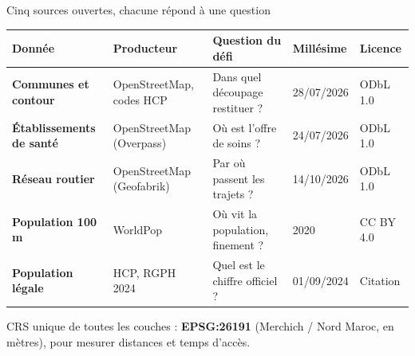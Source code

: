 \documentclass[aspectratio=169,10pt]{beamer}
\begin{document}
\begin{frame}{Cinq sources ouvertes, chacune répond à une question}
  \footnotesize
  \renewcommand{\arraystretch}{1.2}
  \begin{tabularx}{\linewidth}{@{}>{\bfseries}l>{\raggedright\arraybackslash}X>{\raggedright\arraybackslash}Xll@{}}
    \toprule
    \normalfont\textbf{Donnée} & \textbf{Producteur} & \textbf{Question du défi} & \textbf{Millésime} & \textbf{Licence} \\
    \midrule
    Communes et contour & OpenStreetMap, codes HCP & Dans quel découpage restituer ? & 28/07/2026 & ODbL 1.0 \\
    Établissements de santé & OpenStreetMap (Overpass) & Où est l'offre de soins ? & 24/07/2026 & ODbL 1.0 \\
    Réseau routier & OpenStreetMap (Geofabrik) & Par où passent les trajets ? & 14/10/2026 & ODbL 1.0 \\
    Population 100 m & WorldPop & Où vit la population, finement ? & 2020 & CC BY 4.0 \\
    Population légale & HCP, RGPH 2024 & Quel est le chiffre officiel ? & 01/09/2024 & Citation \\
    \bottomrule
  \end{tabularx}
  \vskip3mm
  \small
  CRS unique de toutes les couches : \alert{\bfseries EPSG:26191} (Merchich / Nord Maroc, en mètres),
  pour mesurer distances et temps d'accès.
\end{frame}
\end{document}
